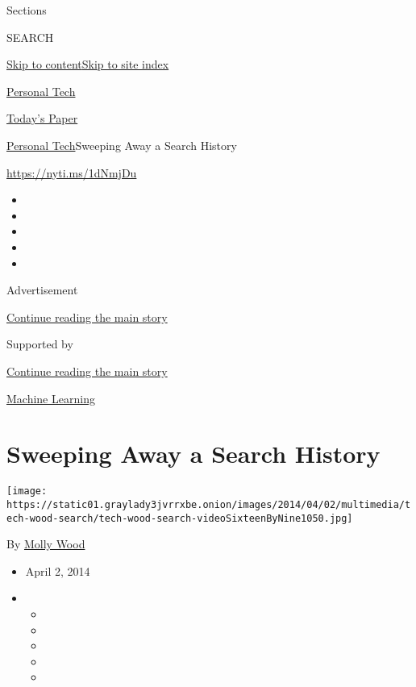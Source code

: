 Sections

SEARCH

\protect\hyperlink{site-content}{Skip to
content}\protect\hyperlink{site-index}{Skip to site index}

\href{https://www.nytimes3xbfgragh.onion/section/technology/personaltech}{Personal
Tech}

\href{https://myaccount.nytimes3xbfgragh.onion/auth/login?response_type=cookie\&client_id=vi}{}

\href{https://www.nytimes3xbfgragh.onion/section/todayspaper}{Today's
Paper}

\href{/section/technology/personaltech}{Personal Tech}\textbar{}Sweeping
Away a Search History

\url{https://nyti.ms/1dNmjDu}

\begin{itemize}
\item
\item
\item
\item
\item
\end{itemize}

Advertisement

\protect\hyperlink{after-top}{Continue reading the main story}

Supported by

\protect\hyperlink{after-sponsor}{Continue reading the main story}

\href{/column/machine-learning}{Machine Learning}

\hypertarget{sweeping-away-a-search-history}{%
\section{Sweeping Away a Search
History}\label{sweeping-away-a-search-history}}

\texttt{[image: https://static01.graylady3jvrrxbe.onion/images/2014/04/02/multimedia/tech-wood-search/tech-wood-search-videoSixteenByNine1050.jpg]}

By \href{http://www.nytimes3xbfgragh.onion/by/molly-wood}{Molly Wood}

\begin{itemize}
\item
  April 2, 2014
\item
  \begin{itemize}
  \item
  \item
  \item
  \item
  \item
  \end{itemize}
\end{itemize}

